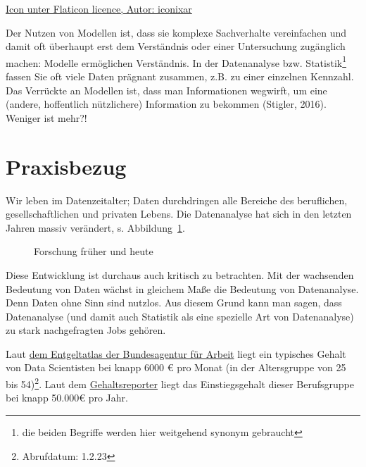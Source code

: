 \documentclass[
  a4paper,
  DIV=11]{scrreprt}
\theoremstyle{definition}
\theoremstyle{definition}
\theoremstyle{definition}
\theoremstyle{remark}
\begin{document}
\href{https://www.flaticon.com/free-icons/professor}{Icon unter Flaticon
licence, Autor: iconixar}

Der Nutzen von Modellen ist, dass sie komplexe Sachverhalte vereinfachen
und damit oft überhaupt erst dem Verständnis oder einer Untersuchung
zugänglich machen: Modelle ermöglichen Verständnis. In der Datenanalyse
bzw. Statistik\footnote{die beiden Begriffe werden hier weitgehend
  synonym gebraucht} fassen Sie oft viele Daten prägnant zusammen, z.B.
zu einer einzelnen Kennzahl. Das Verrückte an Modellen ist, dass man
Informationen wegwirft, um eine (andere, hoffentlich nützlichere)
Information zu bekommen (Stigler, 2016). Weniger ist mehr?!

\section{Praxisbezug}\label{praxisbezug}

Wir leben im Datenzeitalter; Daten durchdringen alle Bereiche des
beruflichen, gesellschaftlichen und privaten Lebens. Die Datenanalyse
hat sich in den letzten Jahren massiv verändert, s.
Abbildung~\ref{fig-fo-früher-heute}.

\begin{figure}


\caption{\label{fig-fo-früher-heute}Forschung früher und heute}

\end{figure}%

Diese Entwicklung ist durchaus auch kritisch zu betrachten. Mit der
wachsenden Bedeutung von Daten wächst in gleichem Maße die Bedeutung von
Datenanalyse. Denn Daten ohne Sinn sind nutzlos. Aus diesem Grund kann
man sagen, dass Datenanalyse (und damit auch Statistik als eine
spezielle Art von Datenanalyse) zu stark nachgefragten Jobs gehören.

Laut \href{https://web.arbeitsagentur.de/entgeltatlas/beruf/129987}{dem
Entgeltatlas der Bundesagentur für Arbeit} liegt ein typisches Gehalt
von Data Scientisten bei knapp 6000 € pro Monat (in der Altersgruppe von
25 bis 54)\footnote{Abrufdatum: 1.2.23}. Laut dem
\href{https://gehaltsreporter.de/gehaelter-von-a-bis-z/it/data-scientist/}{Gehaltsreporter}
liegt das Einstiegsgehalt dieser Berufsgruppe bei knapp 50.000€ pro
Jahr.
\end{document}
